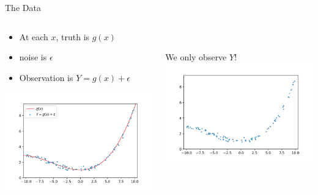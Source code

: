 \documentclass[aspectratio=169]{../latex_main/tntbeamer}  %
\begin{document}
	
	\begin{frame}{The Data}
	    \begin{columns}
	    
	        \begin{column}{.4\textwidth}
	        
	                \begin{itemize}
	                    \item At each $x$, truth is $g(x)$
	                    \item noise is $\epsilon$
	                    \item Observation is $Y = g(x) + \epsilon$
	                \end{itemize}
	                
	                    \includegraphics[scale=.4]{Bild1}
	                
	        \end{column}
	        
	        
	         \begin{column}{.4\textwidth}
	         \\ \bigskip
	         \bigskip
	         \bigskip
	         \medskip
	         
	               \alert{We only observe $Y$!}
	                    \includegraphics[scale=.45]{Bild2}
	                    
	        \end{column}
	    \end{columns}
	\end{frame}
	
\end{document}
